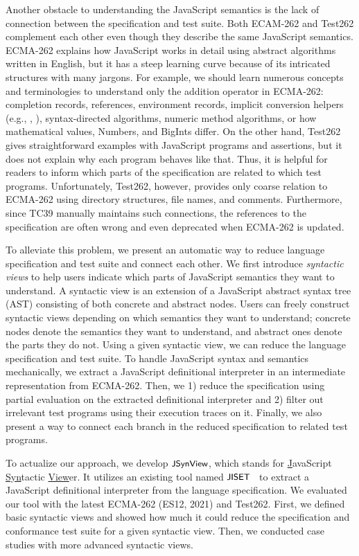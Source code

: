 Another obstacle to understanding the JavaScript semantics is the lack of
connection between the specification and test suite.  Both ECAM-262 and Test262
complement each other even though they describe the same JavaScript semantics.
ECMA-262 explains how JavaScript works in detail using abstract algorithms
written in English, but it has a steep learning curve because of its intricated
structures with many jargons.  For example, we should learn numerous concepts
and terminologies to understand only the addition operator in ECMA-262:
completion records, references, environment records, implicit conversion helpers
(e.g., , ), syntax-directed algorithms,
numeric method algorithms, or how mathematical values, Numbers, and BigInts
differ.  On the other hand, Test262 gives straightforward examples with
JavaScript programs and assertions, but it does not explain why each program
behaves like that.  Thus, it is helpful for readers to inform which parts of the
specification are related to which test programs.  Unfortunately, Test262,
however, provides only coarse relation to ECMA-262 using directory structures,
file names, and comments.  Furthermore, since TC39 manually maintains such
connections, the references to the specification are often wrong and even
deprecated when ECMA-262 is updated.

To alleviate this problem, we present an automatic way to reduce language
specification and test suite and connect each other.  We first introduce
\textit{syntactic views} to help users indicate which parts of JavaScript
semantics they want to understand.  A syntactic view is an extension of a
JavaScript abstract syntax tree (AST) consisting of both concrete and abstract
nodes.  Users can freely construct syntactic views depending on which semantics
they want to understand; concrete nodes denote the semantics they want to
understand, and abstract ones denote the parts they do not.  Using a given
syntactic view, we can reduce the language specification and test suite.  To
handle JavaScript syntax and semantics mechanically, we extract a JavaScript
definitional interpreter in an intermediate representation from ECMA-262.  Then,
we 1) reduce the specification using partial evaluation on the extracted
definitional interpreter and 2) filter out irrelevant test programs using their
execution traces on it.  Finally, we also present a way to connect each branch
in the reduced specification to related test programs.

To actualize our approach, we develop $\textsf{\small JSynView}$, which stands for
\underline{J}avaScript \underline{Syn}tactic \underline{View}er.  It utilizes an
existing tool named $\textsf{\small JISET}$~\cite{jiset} to extract a JavaScript definitional
interpreter from the language specification.  We evaluated our tool with the
latest ECMA-262 (ES12, 2021) and Test262.  First, we defined 
basic syntactic views and showed how much it could reduce the specification and
conformance test suite for a given syntactic view. Then, we conducted
 case studies with more advanced syntactic views.


